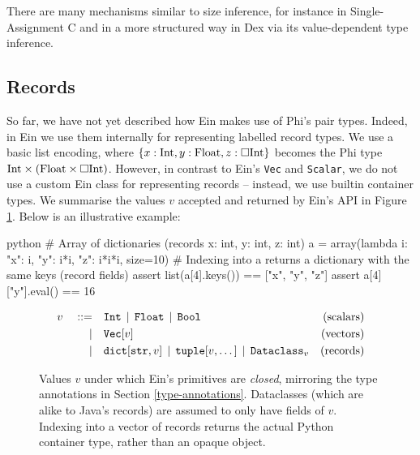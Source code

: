 
There are many mechanisms similar to size inference, for instance in Single-Assignment C and in a more structured way in Dex via its value-dependent type inference. 

\subsection{Records}

So far, we have not yet described how Ein makes use of Phi's pair types. Indeed, in Ein we use them internally for representing labelled record types. We use a basic list encoding, where $\{ x: \mathrm{Int}, y: \mathrm{Float}, z: \Box{\mathrm{Int}} \}$ becomes the Phi type $\phipairtype{\phiinttype}{\left( \phifloattype \times \phivectype{\phiinttype} \right)}$. However, in contrast to Ein's \texttt{Vec} and \texttt{Scalar}, we do not use a custom Ein class for representing records -- instead, we use builtin container types. We summarise the values $v$ accepted and returned by Ein's API in Figure \ref{fig:ein-values}.
Below is an illustrative example:
\begin{center} 
\begin{cminted}{python}
# Array of dictionaries (records {x: int, y: int, z: int})
a = array(lambda i: {"x": i, "y": i*i, "z": i*i*i}, size=10)
# Indexing into a returns a dictionary with the same keys (record fields)
assert list(a[4].keys()) == ["x", "y", "z"]
assert a[4]["y"].eval() == 16
\end{cminted}
\end{center}

\begin{figure}
    \centering
    \begin{align*}
    v \quad::=&\quad 
    \text{\texttt{Int}}
    \,\mid\,
    \text{\texttt{Float}}
    \,\mid\,
    \text{\texttt{Bool}}
    & \text{(scalars)} \\
    \mid&\quad
    \text{\texttt{Vec}}[v]
    & \text{(vectors)} \\
    \mid&\quad
    \text{\texttt{dict}}[\text{\texttt{str}}, v] 
    \,\mid\, \text{\texttt{tuple}}[v, \dots] 
    \,\mid\, \texttt{Dataclass}_v
    & \text{(records)}
    \end{align*}
    \caption{Values $v$ under which Ein's primitives are \textit{closed}, mirroring the type annotations in Section \ref{type-annotations}. Dataclasses (which are alike to Java's records) are assumed to only have fields of $v$. Indexing into a vector of records returns the actual Python container type, rather than an opaque object.}
    \label{fig:ein-values}
\end{figure}

